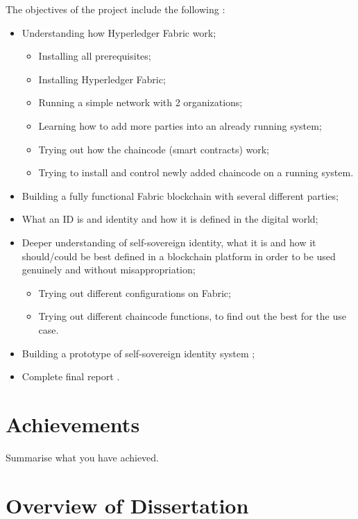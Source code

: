 \documentclass[a4paper,11pt]{report}
\begin{document}
The objectives of the project include the following :  
\begin{itemize}
\item Understanding how Hyperledger Fabric work;
	\begin{itemize}
	\item Installing all prerequisites;
	\item Installing Hyperledger Fabric; 
	\item Running a simple network with 2 organizations; 
	\item Learning how to add more parties into an already running system;
	\item Trying out how the chaincode (smart contracts) work;
	\item Trying to install and control newly added chaincode on a running system.
	\end{itemize}
\item Building a fully functional Fabric blockchain with several different parties;
\item What an ID is  and identity and how it is defined in the digital world;
\item Deeper understanding of self-sovereign identity, what it is and how it should/could be best defined in a blockchain platform in order to be used genuinely and without misappropriation;
	\begin{itemize}
	\item Trying out different configurations on Fabric;
	\item Trying out different chaincode functions, to find out the best for the use case.
	\end{itemize}
\item Building a prototype of self-sovereign identity system ;
\item Complete final report .

\end{itemize}



\section{Achievements}

\label{introduction-achievements}

Summarise what you have achieved.

\section{Overview of Dissertation}
\end{document}
